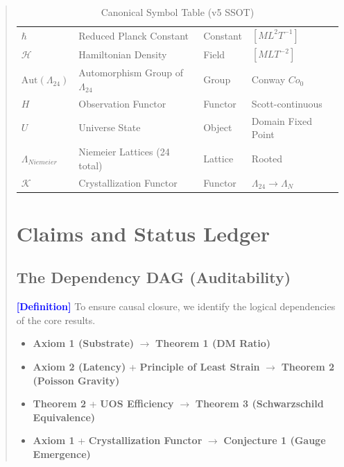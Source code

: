 \documentclass[11pt,titlepage]{article}
\newcommand{\leech}{\Lambda_{24}}
\newcommand{\tagdef}{\textcolor{blue}{\textbf{[Definition]}} }
\begin{document}
\begin{abstract}
\begin{table}[h!]
\begin{tabular}{@{}llll@{}}
$\hbar$ & Reduced Planck Constant & Constant & $[M L^2 T^{-1}]$ \\
$\mathcal{H}$ & Hamiltonian Density & Field & $[M L T^{-2}]$ \\
$\text{Aut}(\leech)$ & Automorphism Group of $\leech$ & Group & Conway $Co_0$ \\
$H$ & Observation Functor & Functor & Scott-continuous \\
$U$ & Universe State & Object & Domain Fixed Point \\
$\Lambda_{Niemeier}$ & Niemeier Lattices (24 total) & Lattice & Rooted \\
$\mathcal{K}$ & Crystallization Functor & Functor & $\leech \to \Lambda_N$ \\ \bottomrule
\end{tabular}
\caption{Canonical Symbol Table (v5 SSOT)}
\end{table}

\newpage
\tableofcontents
\newpage

\section{Claims and Status Ledger}
\subsection{The Dependency DAG (Auditability)}
\tagdef To ensure causal closure, we identify the logical dependencies of the core results.
\begin{itemize}
    \item \textbf{Axiom 1 (Substrate)} $\to$ \textbf{Theorem 1 (DM Ratio)}
    \item \textbf{Axiom 2 (Latency)} + \textbf{Principle of Least Strain} $\to$ \textbf{Theorem 2 (Poisson Gravity)}
    \item \textbf{Theorem 2} + \textbf{UOS Efficiency} $\to$ \textbf{Theorem 3 (Schwarzschild Equivalence)}
    \item \textbf{Axiom 1} + \textbf{Crystallization Functor} $\to$ \textbf{Conjecture 1 (Gauge Emergence)}
\end{itemize}


\end{abstract}
\end{document}
